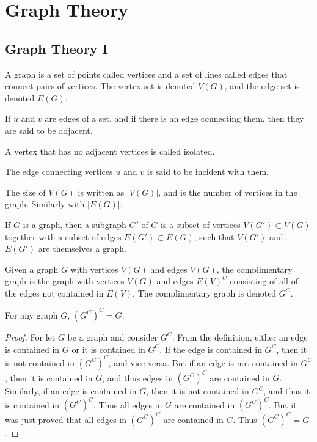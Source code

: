 \documentclass[crop=false,class=book]{standalone}
\begin{document}
\chapter{Graph Theory}
\section{Graph Theory I}
\begin{definition}
A graph is a set of points called vertices and a set of lines called edges that connect pairs of vertices. The vertex set is denoted $V(G)$, and the edge set is denoted $E(G)$.
\end{definition}
\begin{definition}
If $u$ and $v$ are edges of a set, and if there is an edge connecting them, then they are said to be adjacent. 
\end{definition}
\begin{definition}
A vertex that has no adjacent vertices is called isolated.
\end{definition}
\begin{definition}
The edge connecting vertices $u$ and $v$ is said to be incident with them.
\end{definition}
\begin{definition}
The size of $V(G)$ is written as $|V(G)|$, and is the number of vertices in the graph. Similarly with $|E(G)|$.
\end{definition}
\begin{definition}
If $G$ is a graph, then a subgraph $G'$ of $G$ is a subset of vertices $V(G')\subset V(G)$ together with a subset of edges $E(G')\subset E(G)$, such that $V(G')$ and $E(G')$ are themselves a graph.
\end{definition}
\begin{definition}
Given a graph $G$ with vertices $V(G)$ and edges $V(G)$, the complimentary graph is the graph with vertices $V(G)$ and edges $E(V)^C$ consisting of all of the edges not contained in $E(V)$. The complimentary graph is denoted $G^C$.
\end{definition}
\begin{theorem}
For any graph $G$, $(G^C)^C = G$.
\end{theorem}
\begin{proof}
For let $G$ be a graph and consider $G^C$. From the definition, either an edge is contained in $G$ or it is contained in $G^C$. If the edge is contained in $G^C$, then it is not contained in $(G^C)^C$, and vice versa. But if an edge is not contained in $G^C$, then it is contained in $G$, and thus edges in $(G^C)^C$ are contained in $G$. Similarly, if an edge is contained in $G$, then it is not contained in $G^C$, and thus it is contained in $(G^C)^C$. Thus all edges in $G$ are contained in $(G^C)^C$. But it was just proved that all edges in $(G^C)^C$ are contained in $G$. Thus $(G^C)^C = G$.
\end{proof}
\end{document}
